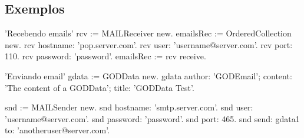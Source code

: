 \subsection{Exemplos}

\begin{godCode}
'Recebendo emails' 
rcv := MAILReceiver new.
emailsRec := OrderedCollection new.
rcv hostname: 'pop.server.com'.
rcv user: 'username@server.com'.
rcv port: 110.
rcv password: 'password'.
emailsRec := rcv receive.

'Enviando email'
gdata := GODData new.
gdata author: 'GODEmail';
	content: 'The content of a GODData';
	title: 'GODData Test'.

snd := MAILSender new.
snd hostname: 'smtp.server.com'.
snd user: 'username@server.com'.
snd password: 'password'.
snd port: 465.
snd send: gdata1 to: 'anotheruser@server.com'.
\end{godCode}
